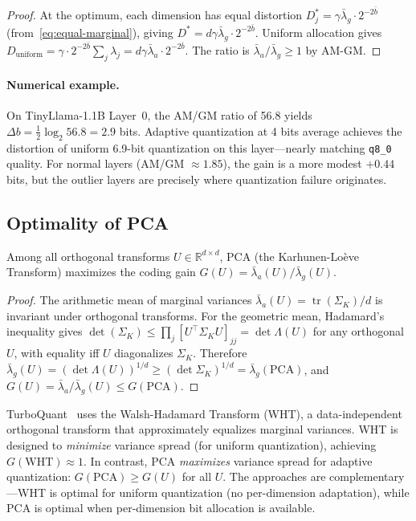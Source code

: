 \begin{proof}
At the optimum, each dimension has equal distortion $D_j^* = \gamma \bar{\lambda}_g \cdot 2^{-2\bar{b}}$ (from~\eqref{eq:equal-marginal}), giving $D^* = d\gamma \bar{\lambda}_g \cdot 2^{-2\bar{b}}$. Uniform allocation gives $D_{\text{uniform}} = \gamma \cdot 2^{-2\bar{b}} \sum_j \lambda_j = d\gamma \bar{\lambda}_a \cdot 2^{-2\bar{b}}$. The ratio is $\bar{\lambda}_a/\bar{\lambda}_g \geq 1$ by AM-GM.
\end{proof}

\paragraph{Numerical example.} On TinyLlama-1.1B Layer~0, the AM/GM ratio of 56.8 yields $\Delta b = \frac{1}{2}\log_2 56.8 = 2.9$ bits. Adaptive quantization at 4 bits average achieves the distortion of uniform 6.9-bit quantization on this layer---nearly matching \texttt{q8\_0} quality. For normal layers (AM/GM $\approx 1.85$), the gain is a more modest $+0.44$ bits, but the outlier layers are precisely where quantization failure originates.

\subsection{Optimality of PCA}
\label{sec:pca-optimal}

\begin{theorem}
\label{thm:pca-optimal}
Among all orthogonal transforms $U \in \mathbb{R}^{d \times d}$, PCA (the Karhunen-Lo\`eve Transform) maximizes the coding gain $G(U) = \bar{\lambda}_a(U) / \bar{\lambda}_g(U)$.
\end{theorem}

\begin{proof}
The arithmetic mean of marginal variances $\bar{\lambda}_a(U) = \operatorname{tr}(\Sigma_K)/d$ is invariant under orthogonal transforms. For the geometric mean, Hadamard's inequality gives $\det(\Sigma_K) \leq \prod_j [U^\top \Sigma_K U]_{jj} = \det \Lambda(U)$ for any orthogonal $U$, with equality iff $U$ diagonalizes $\Sigma_K$. Therefore $\bar{\lambda}_g(U) = (\det \Lambda(U))^{1/d} \geq (\det \Sigma_K)^{1/d} = \bar{\lambda}_g(\text{PCA})$, and $G(U) = \bar{\lambda}_a / \bar{\lambda}_g(U) \leq G(\text{PCA})$.
\end{proof}

\begin{remark}
TurboQuant~\citep{turboquant2026} uses the Walsh-Hadamard Transform (WHT), a data-independent orthogonal transform that approximately equalizes marginal variances. WHT is designed to \emph{minimize} variance spread (for uniform quantization), achieving $G(\text{WHT}) \approx 1$. In contrast, PCA \emph{maximizes} variance spread for adaptive quantization: $G(\text{PCA}) \geq G(U)$ for all $U$. The approaches are complementary---WHT is optimal for uniform quantization (no per-dimension adaptation), while PCA is optimal when per-dimension bit allocation is available.
\end{remark}

